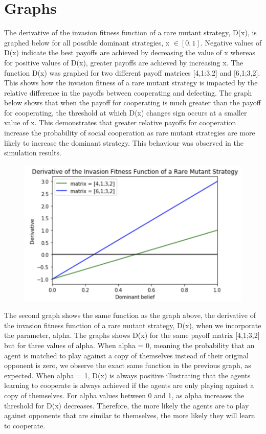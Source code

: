 \documentclass[]{llncs}
\begin{document}
\section{Graphs}
The derivative of the invasion fitness function of a rare mutant strategy, D(x), is graphed below for all possible dominant strategies, x $\in [0,1]$. Negative values of D(x) indicate the best payoffs are achieved by decreasing the value of x whereas for positive values of D(x), greater payoffs are achieved by increasing x. The function D(x) was graphed for two different payoff matrices [4,1:3,2] and [6,1;3,2]. This shows how the invasion fitness of a rare mutant strategy is impacted by the relative difference in the payoffs between cooperating and defecting. The graph below shows that when the payoff for cooperating is much greater than the payoff for cooperating, the threshold at which D(x) changes sign occurs at a smaller value of x. This demonstrates that greater relative payoffs for cooperation increase the probability of social cooperation as rare mutant strategies are more likely to increase the dominant strategy. This behaviour was observed in the simulation results. 

\begin{figure}
\centering
\includegraphics[width=12cm]{images/invasion_fitness}
\end{figure}

The second graph shows the same function as the graph above, the derivative of the invasion fitness function of a rare mutant strategy, D(x), when we incorporate the parameter, alpha. The graphs shows D(x) for the same payoff matrix [4,1;3,2] but for three values of alpha. When alpha = 0, meaning the  probability that an agent is matched to play against a copy of themselves instead of their original opponent is zero, we observe the exact same function in the previous graph, as expected. When alpha = 1, D(x) is always positive illustrating that the agents learning to cooperate is always achieved if the agents are only playing against a copy of themselves. For alpha values between 0 and 1, as alpha increases the threshold for D(x) decreases. Therefore, the more likely the agents are to play against opponents that are similar to themselves, the more likely they will learn to cooperate. 
\end{document}
